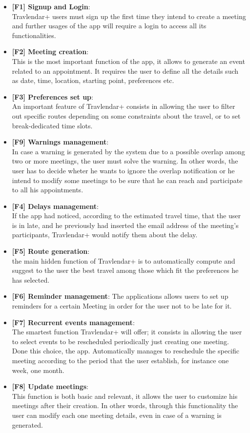 
\begin{itemize}

\item \textbf{[\hypertarget{F1}{F1}] Signup and Login}: \\Travlendar+ users must sign up the first time they intend to create a meeting and further usages of the app will require a login to access all its functionalities.
\item \textbf{[\hypertarget{F2}{F2}] Meeting creation}: \\This is the most important function of the app, it allows to generate an event related to an appointment. It requires the user to define all the details such as date, time, location, starting point, preferences etc. 
\item \textbf{[\hypertarget{F3}{F3}] Preferences set up}: \\An important feature of Travlendar+ consists in allowing the user to filter out specific routes depending on some constraints about the travel, or to set break-dedicated time slots.
\item \textbf{[\hypertarget{F9}{F9}] Warnings management}: \\ In case a warning is generated by the system due to a possible overlap among two or more meetings, the user must solve the warning. In other words, the user has to decide wheter he wants to ignore the overlap notification or he intend to modify some meetings to be sure that he can reach and participate to all his appointments.
\item \textbf{[\hypertarget{F4}{F4}] Delays management}:  \\If the app had noticed, according to the estimated travel time, that the user is in late, and he previously had inserted the email address of the meeting’s participants, Travlendar+ would notify them about the delay. 
\item \textbf{[\hypertarget{F5}{F5}] Route generation}:\\ the main hidden function of Travlendar+ is to automatically compute and suggest to the user the best travel among those which fit the preferences he has selected.
\item \textbf{[\hypertarget{F6}{F6}] Reminder management}: The applications allows users to set up reminders for a certain Meeting in order for the user not to be late for it.
\item \textbf{[\hypertarget{F7}{F7}] Recurrent events management}:\\ The smartest function Travlendar+ will offer; it consists in allowing the user to select events to be rescheduled periodically just creating one meeting. Done this choice, the app. Automatically manages to  reschedule the specific meeting according to the period that the user establish, for instance one week, one month.
\item \textbf{[\hypertarget{F8}{F8}] Update meetings}: \\This function is both basic and relevant, it allows the user to customize his meetings after their creation. In other words, through this functionality the user can modify each one meeting details, even in case of a warning is generated.


\end{itemize}

 
